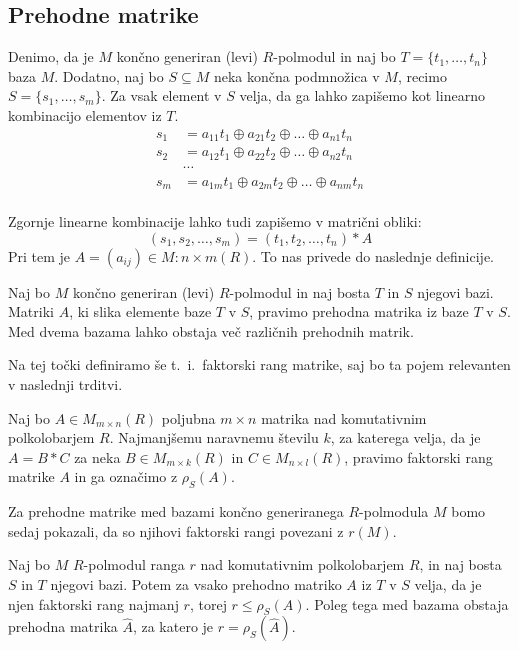 \documentclass[mat1]{fmfdelo}
\begin{document}
\subsection{Prehodne matrike}\label{subsect:prehodmat}
Denimo, da je $M$ končno generiran (levi) $R$-polmodul in naj bo $T = \{t_1, \ldots, t_n\}$ baza $M$. Dodatno, naj bo $S\subseteq M$ neka končna podmnožica v $M$, recimo $S = \{s_1, \ldots, s_m\}$. Za vsak element v $S$ velja, da ga lahko zapišemo kot linearno kombinacijo elementov iz $T$. \begin{align*}
	s_1 &= a_{11}t_1 \oplus a_{21}t_2 \oplus \ldots \oplus a_{n1}t_n \\
	s_2 &= a_{12}t_1 \oplus a_{22}t_2 \oplus \ldots \oplus a_{n2}t_n \\
	&\cdots \\
	s_m &= a_{1m}t_1 \oplus a_{2m}t_2 \oplus \ldots \oplus a_{nm}t_n \\
\end{align*}

Zgornje linearne kombinacije lahko tudi zapišemo v matrični obliki:$$
(s_1, s_2, \ldots, s_m )
 = (t_1, t_2, \ldots, t_n) * A$$ 
Pri tem je $A=(a_{ij})\in M:{n\times m}(R)$.
To nas privede do naslednje definicije.

\begin{definicija}\label{def:prehodmat}
	Naj bo $M$ končno generiran (levi) $R$-polmodul in naj bosta $T$ in $S$ njegovi bazi. Matriki $A$, ki slika elemente baze $T$ v $S$, pravimo prehodna matrika iz baze $T$ v $S$. Med dvema bazama lahko obstaja več različnih prehodnih matrik.
\end{definicija}

Na tej točki definiramo še t.~i.~faktorski rang matrike, saj bo ta pojem relevanten v naslednji trditvi.

\begin{definicija}\label{def:faktorrang}
	Naj bo $A\in M_{m\times n}(R)$ poljubna $m\times n$ matrika nad komutativnim polkolobarjem $R$. Najmanjšemu naravnemu številu $k$, za katerega velja, da je $A= B*C$ za neka $B\in M_{m\times k}(R)$ in $C\in M_{n\times l}(R)$, pravimo faktorski rang matrike $A$ in ga označimo z $\rho_S(A)$.
\end{definicija}

Za prehodne matrike med bazami končno generiranega $R$-polmodula $M$ bomo sedaj pokazali, da so njihovi faktorski rangi povezani z $r(M)$.

\begin{izrek}\label{izr:transmatfakrang}
	Naj bo $M$ $R$-polmodul ranga $r$ nad komutativnim polkolobarjem $R$, in naj bosta $S$ in $T$ njegovi bazi. Potem za vsako prehodno matriko $A$ iz $T$ v $S$ velja, da je njen faktorski rang najmanj $r$, torej $r \leq \rho_S(A)$. Poleg tega med bazama obstaja prehodna matrika $\widehat{A}$, za katero je $r = \rho_S(\widehat{A})$.
\end{izrek}
\end{document}
